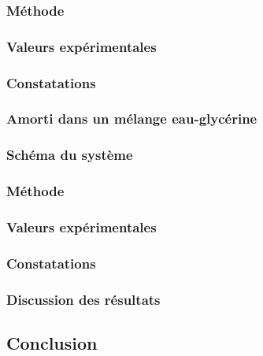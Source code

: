             \subsubsection{Méthode}
    
            \subsubsection{Valeurs expérimentales}
    
            \subsubsection{Constatations}
    
    
            \subsubsection{Amorti dans un mélange eau-glycérine}
            \subsubsection{Schéma du système}
    
            \subsubsection{Méthode}
    
            \subsubsection{Valeurs expérimentales}
    
            \subsubsection{Constatations}
    
    
            \subsubsection{Discussion des résultats}
    
        \subsection{Conclusion}